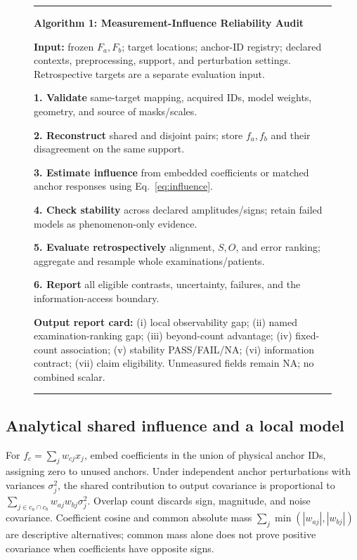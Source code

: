 \documentclass[10pt,twocolumn,letterpaper]{article}
\begin{document}
\begin{figure}[t]
\centering
\begin{minipage}{.97\columnwidth}
\hrule\smallskip
\textbf{Algorithm 1: Measurement-Influence Reliability Audit}\par
\smallskip\small
\textbf{Input:} frozen $F_a,F_b$; target locations; anchor-ID registry; declared contexts, preprocessing, support, and perturbation settings. Retrospective targets are a separate evaluation input.\par
\textbf{1. Validate} same-target mapping, acquired IDs, model weights, geometry, and source of masks/scales.\par
\textbf{2. Reconstruct} shared and disjoint pairs; store $f_a,f_b$ and their disagreement on the same support.\par
\textbf{3. Estimate influence} from embedded coefficients or matched anchor responses using Eq.~\ref{eq:influence}.\par
\textbf{4. Check stability} across declared amplitudes/signs; retain failed models as phenomenon-only evidence.\par
\textbf{5. Evaluate retrospectively} alignment, $S,O$, and error ranking; aggregate and resample whole examinations/patients.\par
\textbf{6. Report} all eligible contrasts, uncertainty, failures, and the information-access boundary.\par
\textbf{Output report card:} (i) local observability gap; (ii) named examination-ranking gap; (iii) beyond-count advantage; (iv) fixed-count association; (v) stability PASS/FAIL/NA; (vi) information contract; (vii) claim eligibility. Unmeasured fields remain NA; no combined scalar.\par
\smallskip\hrule
\end{minipage}
\end{figure}

\subsection{Analytical shared influence and a local model}
For $f_c=\sum_j w_{cj}x_j$, embed coefficients in the union of physical anchor IDs, assigning zero to unused anchors. Under independent anchor perturbations with variances $\sigma_j^2$, the shared contribution to output covariance is proportional to $\sum_{j\in c_a\cap c_b}w_{aj}w_{bj}\sigma_j^2$. Overlap count discards sign, magnitude, and noise covariance. Coefficient cosine and common absolute mass $\sum_j\min(|w_{aj}|,|w_{bj}|)$ are descriptive alternatives; common mass alone does not prove positive covariance when coefficients have opposite signs.
\end{document}
